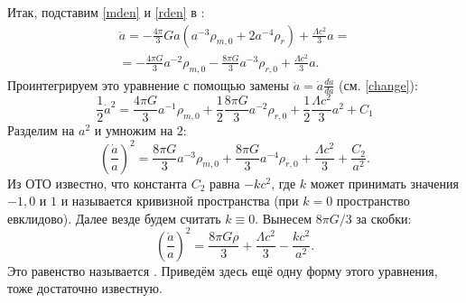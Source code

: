 Итак, подставим \eqref{mden} и \eqref{rden} в :
\begin{multline}
\ddot{a} = -\frac{4 \pi}{3} G a \left(a^{-3} \rho_{m,0} + 2 a^{-4} \rho_r\right) + \frac{\Lambda c^2}{3} a = \\
= -\frac{4\pi G}{3} a^{-2} \rho_{m,0} -\frac{8\pi G}{3} a^{-3} \rho_{r,0} + \frac{\Lambda c^2}{3} a.
\end{multline}
Проинтегрируем это уравнение с помощью замены $\ddot{a} = \dot{a} \displaystyle \frac{d\dot{a}}{da}$ (см. \ref{change}):
\begin{equation}
\frac{1}{2} \dot{a}^2 = \frac{4\pi G}{3} a^{-1} \rho_{m,0} + \frac{1}{2}\frac{8\pi G}{3} a^{-2} \rho_{r,0} + \frac{1}{2} \frac{\Lambda c^2}{3} a^2 + C_1
\end{equation}
Разделим на $a^2$ и умножим на $2$:
\begin{equation}
\left(\frac{\dot{a}}{a}\right)^2 = \frac{8\pi G}{3} a^{-3} \rho_{m,0} + \frac{8\pi G}{3} a^{-4} \rho_{r,0} + \frac{\Lambda c^2}{3} + \frac{C_2}{a^2}.
\label{energy}
\end{equation}
Из ОТО известно, что константа $C_2$ равна $-k c^2$, где $k$ может принимать значения $-1, 0$ и $1$ и называется кривизной пространства (при $k = 0$ пространство евклидово). Далее везде будем считать $k \equiv 0$. Вынесем $8 \pi G / 3$ за скобки:
\begin{equation}
\left(\frac{\dot{a}}{a}\right)^2 = \frac{8\pi G \rho}{3} + \frac{\Lambda c^2}{3} - \frac{k c^2}{a^2}.
\end{equation}
Это равенство называется . Приведём здесь ещё одну форму этого уравнения, тоже достаточно известную. 

